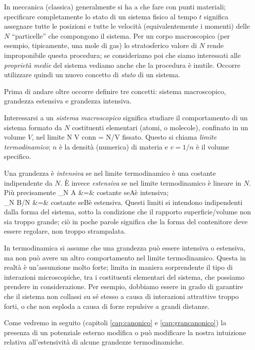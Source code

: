 In meccanica (classica) generalmente si ha a che fare con punti materiali; specificare completamente lo stato di un sistema fisico al tempo $t$ significa assegnare tutte le posizioni e tutte le velocità (equivalentemente i momenti) delle $N$ ``particelle'' che compongono il sistema. Per un corpo macroscopico (per esempio, tipicamente, una mole di gas) lo stratosferico valore di $N$ rende improponibile questa procedura; se consideriamo poi che siamo interessati alle {\em proprietà medie} del sistema vediamo anche che la procedura è inutile. Occorre utilizzare quindi un nuovo concetto di {\em stato} di un sistema.

Prima di andare oltre occorre definire tre concetti: sistema macroscopico, grandezza estensiva e grandezza intensiva.

Interessarsi a un {\em sistema macroscopico} significa studiare il comportamento di un sistema formato da $N$ costituenti elementari (atomi, o molecole), confinato in un volume $V$, nel limite
\be
N \to \infty \quad\quad V \to \infty \quad\quad \textrm{con}\;\;n = N/V\;\; \textrm{fissato}.
\ee
Questo si chiama {\em limite termodinamico}; $n$ è la densità (numerica) di materia e $v = 1/n$ è il volume specifico.

Una grandezza è {\em intensiva} se nel limite termodinamico è una costante indipendente da $N$. È invece {\em estensiva} se nel limite termodinamico è lineare in $N$. Più precisamente
\bea
\lim_{N\to\infty} A &=& \textrm{costante} \quad\quad \textrm{se}\;\;A\;\;\textrm{è intensiva}; \nonumber\\
\lim_{N\to\infty} B/N &=& \textrm{costante} \quad\quad \textrm{se}\;\;B\;\;\textrm{è estensiva}.
\eea
Questi limiti si intendono indipendenti dalla forma del sistema, sotto la condizione che il rapporto superficie/volume non sia troppo grande; ciò in poche parole significa che la forma del contenitore deve essere regolare, non troppo strampalata.

In termodinamica si assume che una grandezza può essere intensiva o estensiva, ma non può avere un altro comportamento nel limite termodinamico. Questa in realtà è un'assunzione molto forte; limita in maniera sorprendente il tipo di interazioni microscopiche, tra i costituenti elementari del sistema, che possiamo prendere in considerazione. Per esempio, dobbiamo essere in grado di garantire che il sistema non collassi su sé stesso a causa di interazioni attrattive troppo forti, o che non esploda a causa di forze repulsive a grandi distanze.

Come vedremo in seguito (capitoli \ref{cap:canonico} e \ref{cap:grancanonico}) la presenza di un potenziale esterno modifica o può modificare la nostra intuizione relativa all'estensività di alcune grandezze termodinamiche.


